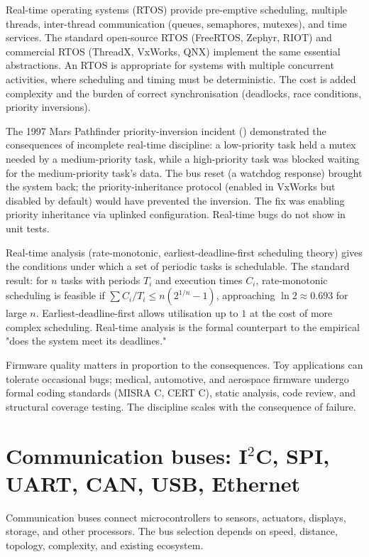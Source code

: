 Real-time operating systems (RTOS) provide pre-emptive scheduling, multiple threads, inter-thread communication (queues, semaphores, mutexes), and time services. The standard open-source RTOS (FreeRTOS, Zephyr, RIOT) and commercial RTOS (ThreadX, VxWorks, QNX) implement the same essential abstractions. An RTOS is appropriate for systems with multiple concurrent activities, where scheduling and timing must be deterministic. The cost is added complexity and the burden of correct synchronisation (deadlocks, race conditions, priority inversions).

The 1997 Mars Pathfinder priority-inversion incident (\cite{paper:jones-pathfinder-1997}) demonstrated the consequences of incomplete real-time discipline: a low-priority task held a mutex needed by a medium-priority task, while a high-priority task was blocked waiting for the medium-priority task's data. The bus reset (a watchdog response) brought the system back; the priority-inheritance protocol (enabled in VxWorks but disabled by default) would have prevented the inversion. The fix was enabling priority inheritance via uplinked configuration. Real-time bugs do not show in unit tests.

Real-time analysis (rate-monotonic, earliest-deadline-first scheduling theory) gives the conditions under which a set of periodic tasks is schedulable. The standard result: for $n$ tasks with periods $T_i$ and execution times $C_i$, rate-monotonic scheduling is feasible if $\sum C_i/T_i \leq n(2^{1/n} - 1)$, approaching $\ln 2 \approx 0.693$ for large $n$. Earliest-deadline-first allows utilisation up to $1$ at the cost of more complex scheduling. Real-time analysis is the formal counterpart to the empirical "does the system meet its deadlines."

Firmware quality matters in proportion to the consequences. Toy applications can tolerate occasional bugs; medical, automotive, and aerospace firmware undergo formal coding standards (MISRA C, CERT C), static analysis, code review, and structural coverage testing. The discipline scales with the consequence of failure.

\section{Communication buses: I$^2$C, SPI, UART, CAN, USB, Ethernet}

Communication buses connect microcontrollers to sensors, actuators, displays, storage, and other processors. The bus selection depends on speed, distance, topology, complexity, and existing ecosystem.

